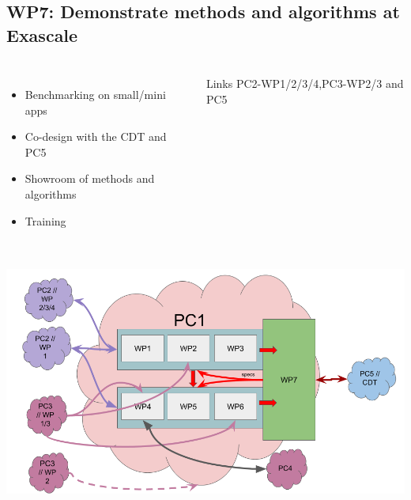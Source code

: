 \subsection{WP7: Demonstrate methods and algorithms at Exascale}
\begin{frame}
  \frametitle{\insertsectionhead}
  \framesubtitle{\insertsubsectionhead}

  \begin{columns}
    \begin{itemize}
      \item Benchmarking on small/mini apps 
      \item Co-design with the CDT and PC5
      \item Showroom of methods and algorithms
      \item Training
    \end{itemize}
    \begin{alertblock}{Links}
      PC2-WP1/2/3/4,PC3-WP2/3 and PC5
    \end{alertblock}
   
  \end{columns}
\end{frame}

\begin{frame}[plain]
  \frametitle{}
  \framesubtitle{}

  \begin{center}
    \includegraphics[width=.9\linewidth]{../../figures/exama-pc.png}
  \end{center}

  

\end{frame}


